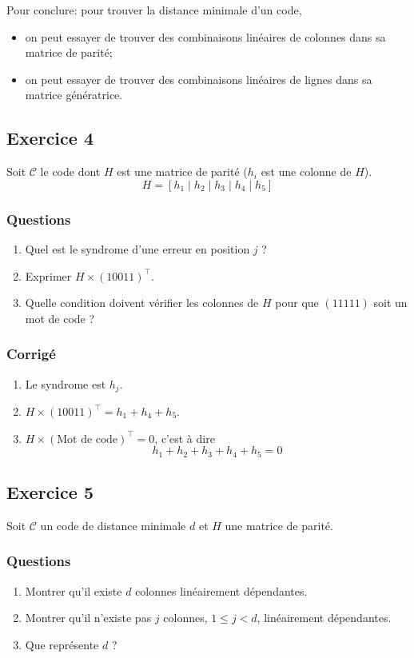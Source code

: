 \documentclass[a4paper,10pt,twocolumn]{article}
\theoremstyle{break}
\newcommand{\code}[1]{\mathcal{#1}}
\newcommand{\C}{\code{C}}
\begin{document}
Pour conclure: pour trouver la distance minimale d'un code,
\begin{itemize}
 \item on peut essayer de trouver des combinaisons linéaires de colonnes dans sa matrice de parité;
 \item on peut essayer de trouver des combinaisons linéaires de lignes dans sa matrice génératrice.
\end{itemize}

\subsection*{Exercice 4}
Soit $\C$ le code dont $H$ est une matrice de parité ($h_i$ est une colonne de $H$).
$$H = [h_1 \mid h_2 \mid h_3 \mid h_4 \mid h_5 ]$$

\subsubsection*{Questions}
\begin{enumerate}
 \item Quel est le syndrome d'une erreur en position $j$ ?
 \item Exprimer $H \times (10011)^\top$.
 \item Quelle condition doivent vérifier les colonnes de $H$ pour que $(11111)$ soit un mot de code ?
\end{enumerate}

\subsubsection*{Corrigé}
\begin{enumerate}
 \item Le syndrome est $h_j$.
 \item $H \times (10011)^\top = h_1 + h_4 + h_5$.
 \item $H \times (\text{Mot de code})^\top = 0$, c'est à dire 
 $$h_1 + h_2 + h_3 + h_4 + h_5 = 0$$
\end{enumerate}

\subsection*{Exercice 5}
Soit $\C$ un code de distance minimale $d$ et $H$ une matrice de parité.

\subsubsection*{Questions}
\begin{enumerate}
 \item Montrer qu'il existe $d$ colonnes linéairement dépendantes.
 \item Montrer qu'il n'existe pas $j$ colonnes, $1 \le j < d$, linéairement dépendantes.
 \item Que représente $d$ ?
\end{enumerate}
\end{document}
